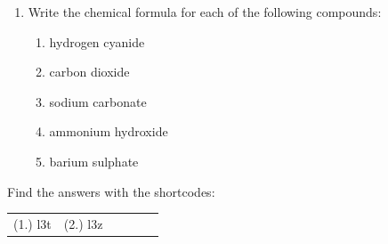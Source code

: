 \begin{enumerate}[noitemsep, label=\textbf{\arabic*}. ]
{\begin{center}
\begin{xtabular*}{\mytablewidth}[t]{|p{10\mystarwidth}|p{10\mystarwidth}|p{10\mystarwidth}|p{10\mystarwidth}|}
    
         &
    
    
         &
    
    
     \tabularnewline{}
    \end{xtabular*}
      \end{center}
    \begin{center}{\small\bfseries Table 5.5}\end{center}
    
    \addtocounter{footnote}{-0}
    
        }%
      
    \par
          \label{m38689*uid101}\item Write the chemical formula for each of the following compounds:
\label{m38689*id145444}\begin{enumerate}[noitemsep, label=\textbf{\alph*}. ] 
            \label{m38689*uid102}\item hydrogen cyanide
\label{m38689*uid103}\item carbon dioxide
\label{m38689*uid104}\item sodium carbonate
\label{m38689*uid105}\item ammonium hydroxide
\label{m38689*uid106}\item barium sulphate
\end{enumerate}
                \end{enumerate}
        
        

      
    
\label{m38689*cid121}
\par {} Find the answers with the shortcodes:
 \par \begin{tabular}[h]{cccccc}
 (1.) l3t  &  (2.) l3z  & \end{tabular}



